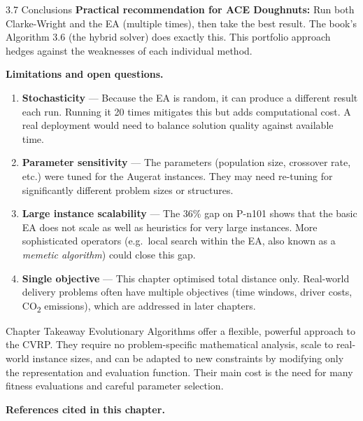 \documentclass[aspectratio=169,10pt]{beamer}
\begin{document}
\begin{frame}[allowframebreaks]{3.7 Conclusions}
  \textbf{Practical recommendation for ACE Doughnuts:}
  Run both Clarke-Wright and the EA (multiple times), then take the best result.
  The book's Algorithm 3.6 (the hybrid solver) does exactly this.
  This portfolio approach hedges against the weaknesses of each individual method.

  \framebreak

  \textbf{Limitations and open questions.}

  \begin{enumerate}
    \item \textbf{Stochasticity} — Because the EA is random, it can produce a different result
          each run.
          Running it 20 times mitigates this but adds computational cost.
          A real deployment would need to balance solution quality against available time.
    \item \textbf{Parameter sensitivity} — The parameters (population size, crossover rate, etc.)
          were tuned for the Augerat instances.
          They may need re-tuning for significantly different problem sizes or structures.
    \item \textbf{Large instance scalability} — The 36\% gap on P-n101 shows that the
          basic EA does not scale as well as heuristics for very large instances.
          More sophisticated operators (e.g.\ local search within the EA, also known as
          a \emph{memetic algorithm}) could close this gap.
    \item \textbf{Single objective} — This chapter optimised total distance only.
          Real-world delivery problems often have multiple objectives (time windows, driver costs,
          CO\textsubscript{2} emissions), which are addressed in later chapters.
  \end{enumerate}

  \begin{alertblock}{Chapter Takeaway}
    Evolutionary Algorithms offer a flexible, powerful approach to the CVRP.
    They require no problem-specific mathematical analysis, scale to real-world instance sizes,
    and can be adapted to new constraints by modifying only the representation and evaluation function.
    Their main cost is the need for many fitness evaluations and careful parameter selection.
  \end{alertblock}

  \framebreak

  \textbf{References cited in this chapter.}


\end{frame}
\end{document}
